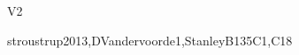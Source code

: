 \begin{syllabus}
\begin{competences}{V2}
    \item {} 
    \item {} 
    \item {}
    \item {} 
    \item {}
\end{competences}

\begin{unit}{\SDFFundamentalProgrammingConcepts}{}{stroustrup2013,DVandervoorde1,StanleyB13}{5}{C1,C18}
\begin{topics}
	\item \SDFFundamentalProgrammingConceptsTopicBasic
	\item \SDFFundamentalProgrammingConceptsTopicVariables
	\item \SDFFundamentalProgrammingConceptsTopicExpressions
	\item \SDFFundamentalProgrammingConceptsTopicSimple
	\item \SDFFundamentalProgrammingConceptsTopicConditional
	\item \SDFFundamentalProgrammingConceptsTopicFunctions
	\item \SDFFundamentalProgrammingConceptsTopicThe
\end{topics}

\begin{learningoutcomes}
	\item \SDFFundamentalProgrammingConceptsLOAnalyzeAndBehavior [\Usage]
	\item \SDFFundamentalProgrammingConceptsLOIdentifyAndOf [\Usage]
	\item \SDFFundamentalProgrammingConceptsLOWritePrograms [\Usage]
	\item \SDFFundamentalProgrammingConceptsLOModify [\Usage]
	\item \SDFFundamentalProgrammingConceptsLODesignImplement [\Usage]
	\item \SDFFundamentalProgrammingConceptsLOWriteAUses [\Usage]
	\item \SDFFundamentalProgrammingConceptsLOChooseAppropriateIteration [\Usage]
	\item \SDFFundamentalProgrammingConceptsLODescribeTheRecursion [\Usage]
	\item \SDFFundamentalProgrammingConceptsLOIdentifyTheAndCase [\Usage]
\end{learningoutcomes}
\end{unit}


\end{syllabus}
